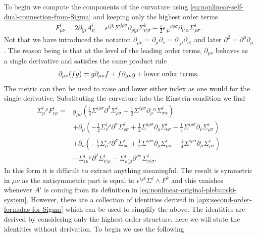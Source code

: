 \documentclass[10pt]{report}
\theoremstyle{definition}
\begin{document}
        To begin we compute the components of the curvature using \cref{eq:nonlinear-self-dual-connection-from-Sigma} and keeping only the highest order terms 
        \begin{align}
            F^i_{\mu\nu} = 2\partial_{[\mu} A^i_{\nu]} = \epsilon^{ijk} \Sigma^{j\rho\sigma}\partial_{\rho[\mu} \Sigma^k_{\nu]\sigma} - \frac{i}{2} \epsilon_{[\mu}{}^{\nu\rho\sigma} \partial_{\nu]\alpha} \Sigma^i_{\rho\sigma}.
        \end{align}
        Not that we have introduced the notation $\partial_{\mu\nu} = \partial_\mu \partial_\nu = \partial_{(\mu} \partial_{\nu)}$ and later $\partial^2 = \partial^\mu \partial_\mu$. The reason being is that at the level of the leading order terms, $\partial_{\mu\nu}$ behaves as a single derivative and satisfies the same product rule
        \begin{align}
            \partial_{\mu\nu}(fg) = g \partial_{\mu\nu} f  + f \partial_{\mu\nu} g + {\rm lower\ order\ terms}.
        \end{align}
        The metric can then be used to raise and lower either index as one would for the single derivative. Substituting the curvature into the Einstein condition we find 
        \begin{align}
            \Sigma^i_{\mu}{}^\rho F^i_{\nu\rho} = & g_{\mu\nu} \left( \frac{1}{4} \Sigma^{i\rho\sigma} \partial^2 \Sigma^i_{\rho\sigma} + \frac{1}{2} \Sigma^{i\rho\sigma} \partial_{\rho}{}^\alpha \Sigma^i_{\sigma\alpha}\right) \\ & + \partial_\mu \left( -\frac{1}{2} \Sigma^i_\nu{}^\rho \partial^\sigma \Sigma^i_{\rho\sigma} + \frac{1}{2} \Sigma^{i\rho\sigma} \partial_\rho \Sigma^i_{\nu\sigma} - \frac{1}{4} \Sigma^{i\rho\sigma} \partial_\nu \Sigma^i_{\rho\sigma} \right) \\ & + \partial_\nu \left( -\frac{1}{2} \Sigma^i_\mu{}^\rho \partial^\sigma \Sigma^i_{\rho\sigma} + \frac{1}{2} \Sigma^{i\rho\sigma} \partial_\rho \Sigma^i_{\mu\sigma} - \frac{1}{4} \Sigma^{i\rho\sigma} \partial_\mu \Sigma^i_{\rho\sigma} \right) \\ & - \Sigma^i_{(\mu}{}^\rho \partial^2 \Sigma^i_{\nu)\rho} - \Sigma^i_{\rho(\mu} \partial^{\rho\sigma} \Sigma^i_{\nu)\sigma}.
        \end{align}
        In this form it is difficult to extract anything meaningful. The result is symmetric in $\mu\nu$ as the antisymmetric part is equal to $\epsilon^{ijk} \Sigma^j \wedge F^k$ and this vanishes whenever $A^i$ is coming from its definition in \cref{eq:nonlinear-original-plebanski-system}. However, there are a collection of identities derived in \cref{apx:second-order-formulas-for-Sigma} which can be used to simplify the above. The identities are derived by considering only the highest order structure, here we will state the identities without derivation. To begin we use the following 
\end{document}
